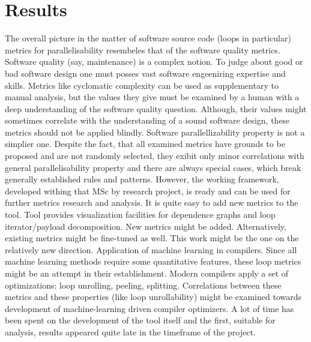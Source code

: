 \chapter{Results}
\label{results}
\qquad The overall picture in the matter of software source code (loops in particular) metrics for  parallelisability resembeles that of the software quality metrics. Software quality (say, maintenance) is a complex notion. To judge about good or bad software design one must posses vast software engeeniring expertise and skills. Metrics like cyclomatic complexity can be used as supplementary to manual analysis, but the values they give must be examined by a human with a deep understanding of the software quality question. Although, their values might sometimes correlate with the understanding of a sound software design, these metrics should not be applied blindly. \newline
\null\qquad Software parallellizability property is not a simplier one. Despite the fact, that all examined metrics have grounds to be proposed and are not randomly selected, they exibit only minor correlations with general parallelisability property and there are always special cases, which break generally established rules and patterns. \newline
\null\qquad However, the working framework, developed withing that  MSc by research project, is ready and can be used for further metrics research and analysis. It is quite easy to add new metrics to the tool. Tool provides visualization facilities for dependence graphs and loop iterator/payload decomposition. New metrics might be added. Alternatively, existing metrics might be fine-tuned as well. This work might be the one on the relatively new direction. Application of machine learning in compilers. Since all machine learning methods require some quantitative features, these loop metrics might be an attempt in their establishment. Modern compilers apply a set of optimizations: loop unrolling, peeling, splitting. Correlations between these metrics and these properties (like loop unrollability) might be examined towards development of machine-learning driven compiler optimizers.\newline
\null\qquad A lot of time has been spent on the development of the tool itself and the first, suitable for analysis, results appeared quite late in the timeframe of the project.         